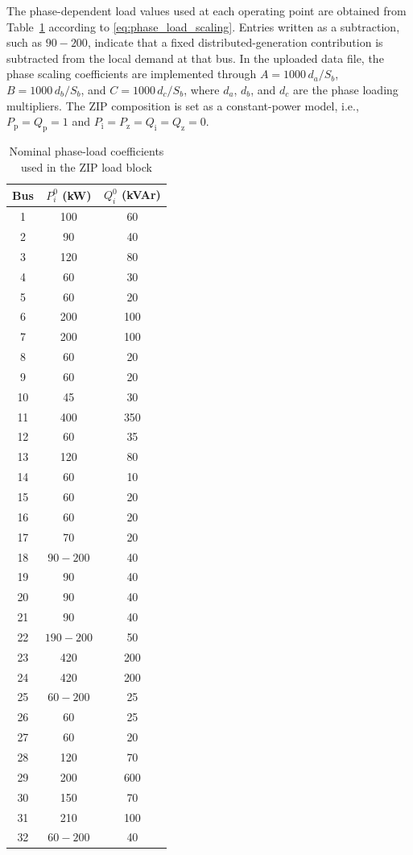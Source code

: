 \documentclass[journal]{IEEEtran}
\begin{document}
The phase-dependent load values used at each operating point are obtained from
Table~\ref{tab:appendix_load_data} according to
\eqref{eq:phase_load_scaling}. Entries written as a subtraction, such as
$90-200$, indicate that a fixed distributed-generation contribution is
subtracted from the local demand at that bus. In the uploaded data file, the
phase scaling coefficients are implemented through $A=1000\,d_a/S_b$,
$B=1000\,d_b/S_b$, and $C=1000\,d_c/S_b$, where $d_a$, $d_b$, and $d_c$ are
the phase loading multipliers. The ZIP composition is set as a constant-power
model, i.e., $P_{\mathrm{p}}=Q_{\mathrm{p}}=1$ and
$P_{\mathrm{i}}=P_{\mathrm{z}}=Q_{\mathrm{i}}=Q_{\mathrm{z}}=0$.

\begin{table}[H]
\centering
\caption{Nominal phase-load coefficients used in the ZIP load block}
\label{tab:appendix_load_data}
\setlength{\tabcolsep}{3pt}
\renewcommand{\arraystretch}{1.0}
\begin{tabular}{@{}ccc@{}}
\toprule
Bus & $P_i^0$ (kW) & $Q_i^0$ (kVAr) \\
\midrule
1 & 100 & 60 \\
2 & 90 & 40 \\
3 & 120 & 80 \\
4 & 60 & 30 \\
5 & 60 & 20 \\
6 & 200 & 100 \\
7 & 200 & 100 \\
8 & 60 & 20 \\
9 & 60 & 20 \\
10 & 45 & 30 \\
11 & 400 & 350 \\
12 & 60 & 35 \\
13 & 120 & 80 \\
14 & 60 & 10 \\
15 & 60 & 20 \\
16 & 60 & 20 \\
17 & 70 & 20 \\
18 & $90-200$ & 40 \\
19 & 90 & 40 \\
20 & 90 & 40 \\
21 & 90 & 40 \\
22 & $190-200$ & 50 \\
23 & 420 & 200 \\
24 & 420 & 200 \\
25 & $60-200$ & 25 \\
26 & 60 & 25 \\
27 & 60 & 20 \\
28 & 120 & 70 \\
29 & 200 & 600 \\
30 & 150 & 70 \\
31 & 210 & 100 \\
32 & $60-200$ & 40 \\
\bottomrule
\end{tabular}
\end{table}
\end{document}
